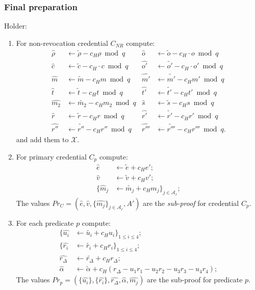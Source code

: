 \subsubsection{Final preparation}\label{sec:final}
Holder:
\begin{enumerate}
\item For non-revocation credential $C_{NR}$ compute:
\begin{align*}
\widehat{\rho} &\leftarrow \widetilde{\rho} - c_H\rho\bmod{q} &
\widehat{o} &\leftarrow \widetilde{o} - c_H\cdot o\bmod{q}\\
\widehat{c} &\leftarrow \widetilde{c} - c_H\cdot c\bmod{q} &
\widehat{o'} &\leftarrow \widetilde{o'} - c_H\cdot o'\bmod{q}\\
\widehat{m} &\leftarrow \widetilde{m} - c_H m\bmod{q} &
\widehat{m'} &\leftarrow \widetilde{m'} - c_H m'\bmod{q}\\
\widehat{t} &\leftarrow \widetilde{t} - c_H t\bmod{q} &
\widehat{t'} &\leftarrow \widetilde{t'} - c_H t'\bmod{q}\\
\widehat{m_2} &\leftarrow \widetilde{m_2} - c_H m_2\bmod{q} &
\widehat{s} &\leftarrow \widetilde{s} - c_H s\bmod{q}\\
\widehat{r} &\leftarrow \widetilde{r} - c_H r\bmod{q} &
\widehat{r'} &\leftarrow \widetilde{r'} - c_H r'\bmod{q}\\
\widehat{r''} &\leftarrow \widetilde{r''} - c_H r''\bmod{q} &
\widehat{r'''} &\leftarrow \widetilde{r'''} - c_H r'''\bmod{q}.
\end{align*}
and add them to $\mathcal{X}$.
\item For primary credential $C_p$ compute:
\begin{align}
\widehat{e}& \leftarrow \widetilde{e}+c_H e';\\
\widehat{v}& \leftarrow \widetilde{v}+c_H v';\\
\{\widehat{m}_j& \leftarrow \widetilde{m_j} + c_H m_j\}_{j \in \mathcal{A}_{\overline{r}}};
\end{align}
The values $Pr_C=(\widehat{e},\widehat{v},\{\widehat{m_j}\}_{j \in \mathcal{A}_{\overline{r}}},A')$ are the \emph{sub-proof}
for credential $C_p$.
\item For each predicate $p$ compute:
\begin{align}
\{\widehat{u_i}& \leftarrow \widetilde{u_i}+c_H u_i\}_{1\leq i \leq 4};\\
\{\widehat{r_i}& \leftarrow \widetilde{r_i}+c_H r_i\}_{1\leq i \leq 4};\\
\widehat{r_{\Delta}}& \leftarrow \widetilde{r_{\Delta}}+c_H r_{\Delta};\\
\widehat{\alpha}& \leftarrow \widetilde{\alpha}+c_H (r_{\Delta}- u_1r_1 - u_2r_2 - u_3r_3 - u_4r_4); 
\end{align}
The values $Pr_p =( \{\widehat{u_i}\}, \{\widehat{r_i}\},\widehat{r_{\Delta}},\widehat{\alpha},\widehat{m_j})$ are the sub-proof for predicate $p$.
\end{enumerate}

